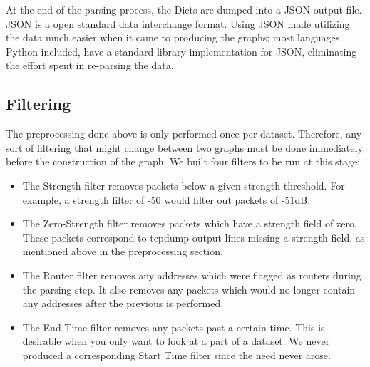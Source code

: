 At the end of the parsing process, the Dicts are dumped into a JSON output file.
JSON is a open standard data interchange format.
Using JSON made utilizing the data much easier when it came to producing the graphs; most languages, Python included, have a standard library implementation for JSON, eliminating the effort spent in re-parsing the data. %

\subsection{Filtering}
The preprocessing done above is only performed once per dataset.
Therefore, any sort of filtering that might change between two graphs must be done immediately before the construction of the graph.
We built four filters to be run at this stage:
\begin{itemize}
\item The Strength filter removes packets below a given strength threshold.
  For example, a strength filter of -50 would filter out packets of -51dB.
\item The Zero-Strength filter removes packets which have a strength field of zero.
  These packets correspond to tcpdump output lines missing a strength field, as mentioned above in the preprocessing section.
\item The Router filter removes any addresses which were flagged as routers during the parsing step.
  It also removes any packets which would no longer contain any addresses after the previous is performed.
\item The End Time filter removes any packets past a certain time.
  This is desirable when you only want to look at a part of a dataset.
  We never produced a corresponding Start Time filter since the need never arose.
\end{itemize}

